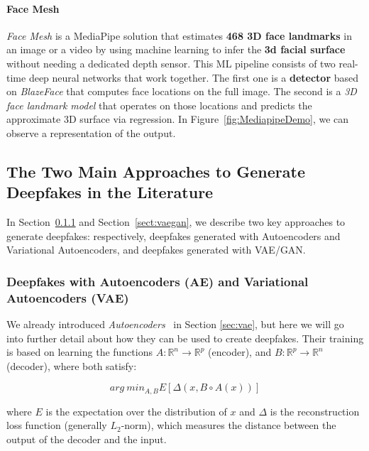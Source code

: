 \documentclass[preprint]{elsarticle}
\begin{document}
\paragraph{Face Mesh}
\emph{Face Mesh} is a MediaPipe solution that estimates \textbf{468 3D face landmarks} in an image or a video by using machine learning to infer the \textbf{3d facial surface} without needing a dedicated depth sensor.
This ML pipeline consists of two real-time deep neural networks that work together.
The first one is a \textbf{detector} based on \emph{BlazeFace} that computes face locations on the full image.
The second is a \emph{3D face landmark model} \cite{kartynnik2019realtime} that operates on those locations and predicts the 
approximate 3D surface via regression. In Figure~\ref{fig:MediapipeDemo}, we can observe a representation of the output.


\subsection{The Two Main Approaches to Generate Deepfakes in the Literature}\label{section:vaegan}
In Section~\ref{sec:deep-vae} and Section~\ref{sect:vaegan}, we describe two key approaches to generate deepfakes: respectively, deepfakes generated with Autoencoders and Variational Autoencoders, and deepfakes generated with VAE/GAN.

\subsubsection{Deepfakes with Autoencoders (AE) and Variational Autoencoders (VAE)}\label{sec:deep-vae}

We already introduced \emph{Autoencoders}~\cite{bank2021autoencoders} in Section \ref{sec:vae}, but here we will go into further detail  about how they can be used to create deepfakes. Their training is based on learning the functions $A : \mathbb{R}^n \rightarrow \mathbb{R}^p$ (encoder), 
and $B:\mathbb{R}^p \rightarrow \mathbb{R}^n$ (decoder), where both satisfy:

\begin{equation}
	arg~min_{A,B}E[\Delta(x,B \circ A(x))]
\end{equation}

\noindent where $E$ is the expectation over the distribution of $x$ and $\Delta$ is the reconstruction loss function (generally $L_2$-norm), which measures the distance between the output of the decoder and the input.
\end{document}
